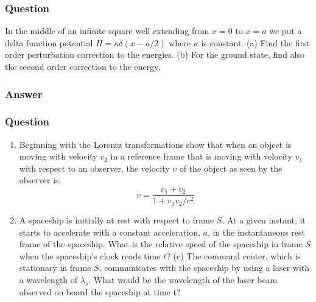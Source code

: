 \subsubsection{Question}

In the middle of an infinite square well extending from $x = 0$ to $x = a$ we put a delta function potential $H = \kappa\delta(x-a/2)$ where $\kappa$ is constant. (a) Find the first order perturbation correction to the energies. (b) For the ground state, find also the second order correction to the energy.

\subsubsection{Answer}


\subsubsection{Question}
\begin{enumerate}
	\item Beginning with the Lorentz transformations show that when an object is moving with velocity $v_2$ in a reference frame that is moving with velocity $v_1$ with respect to an observer, the velocity $v$ of the object as seen by the observer is:
	\begin{equation}
		v = \frac{v_1+v_2}{1+v_1v_2/c^2}
	\end{equation}
	\item A spaceship is initially at rest with respect to frame $S$. At a given instant, it starts to accelerate with a constant acceleration, $a$, in the instantaneous rest frame of the spaceship. What is the relative speed of the spaceship in frame $S$ when the spaceship’s clock reads time $t$? (c) The command center, which is stationary in frame $S$, communicates with the spaceship by using a laser with a wavelength of $\lambda_s$. What would be the wavelength of the laser beam observed on board the spaceship at time t?
\end{enumerate}
